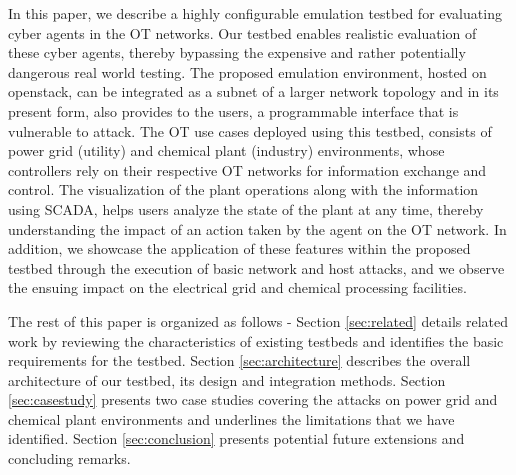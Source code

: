 In this paper, we describe a highly configurable emulation testbed for evaluating cyber agents in the OT networks.
Our testbed enables realistic evaluation of these cyber agents, thereby bypassing the expensive and rather potentially dangerous real world testing. The proposed emulation environment, hosted on openstack, can be integrated as a subnet of a larger network topology and in its present form, also provides to the users, a programmable interface that is vulnerable to attack. The OT use cases deployed using this testbed, consists of power grid (utility) and chemical plant (industry) environments, whose controllers rely on their respective OT networks for information exchange and control. The visualization of the plant operations along with the information using SCADA, helps users analyze the state of the plant at any time, thereby understanding the impact of an action taken by the agent on the OT network. In addition, we showcase the application of these features within the proposed testbed through the execution of basic network and host attacks, and we observe the ensuing impact on the electrical grid and chemical processing facilities.


The rest of this paper is organized as follows - Section \ref{sec:related} details related work by reviewing the characteristics of existing testbeds and identifies the basic requirements for the testbed.
Section \ref{sec:architecture} describes the overall architecture of our testbed, its design and integration methods. Section \ref{sec:casestudy} presents two case studies covering the attacks on power grid and chemical plant environments and underlines
the limitations that we have identified. Section \ref{sec:conclusion} presents potential future extensions and concluding remarks.


